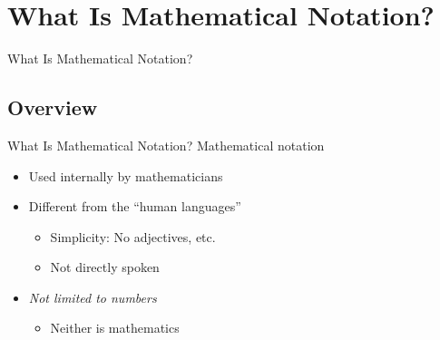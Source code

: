 \documentclass{beamer}
\begin{document}
	\section{What Is Mathematical Notation?}
		\begin{frame}
			\begin{center}
				What Is Mathematical Notation?
			\end{center}
		\end{frame}
		\subsection{Overview}
			\begin{frame}{What Is Mathematical Notation?}
				Mathematical notation
				\begin{itemize}
					\item Used internally by mathematicians
					\item Different from the ``human languages''
					\begin{itemize}
						\item Simplicity: No adjectives, etc.
						\item Not directly spoken
					\end{itemize}
					\item \textit{Not limited to numbers}
					\begin{itemize}
						\item Neither is mathematics
					\end{itemize}
				\end{itemize}
			\end{frame}
\end{document}
